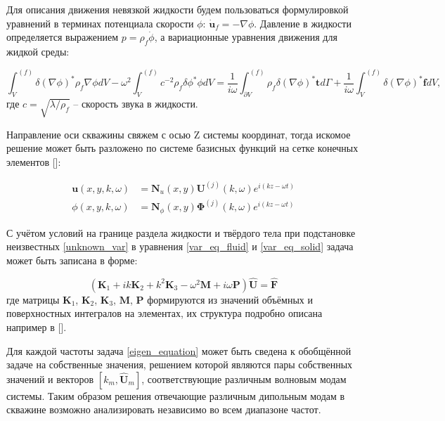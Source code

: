 \documentclass[a4paper,11pt]{article}
\begin{document}
Для описания движения невязкой жидкости будем пользоваться формулировкой уравнений в терминах потенциала скорости $\phi$: $\dot{\mathbf{u}}_f = - \nabla \phi$. Давление в жидкости определяется выражением $p = \rho_f \dot{\phi}$, а вариационные уравнения движения для жидкой среды:

\begin{equation}
\int_{V}^{(f)} \delta (\nabla\phi)^* \rho_f  \nabla \phi dV - \omega^2 \int_{V}^{(f)}  c^{-2} \rho_f \delta \phi^*  \phi dV = \frac{1}{i\omega}\int_{\partial V}^{(f)} \rho_f \delta(\nabla \phi)^* \mathbf{t} d\Gamma + \frac{1}{i\omega} \int_{V}^{(f)} \delta(\nabla \phi)^* \mathbf{f} dV, \label{var_eq_fluid}
\end{equation}
где $c = \sqrt{\lambda/\rho_f}$ -- скорость звука в жидкости.

Направление оси скважины свяжем с осью Z системы координат, тогда искомое решение может быть разложено по системе базисных функций на сетке конечных элементов []:

\begin{equation}
\begin{split}
\mathbf{u}(x,y,k,\omega) & = \mathbf{N}_u(x,y) \mathbf{U}^{(j)}(k,\omega) e^{i(kz-\omega t)} \\
\phi(x,y,k,\omega) & = \mathbf{N}_{\phi}(x,y) \mathbf{\Phi}^{(j)}(k,\omega) e^{i(kz-\omega t)}
\end{split} \label{unknown_var}
\end{equation}

С учётом условий на границе раздела жидкости и твёрдого тела при подстановке неизвестных \eqref{unknown_var} в уравнения \eqref{var_eq_fluid} и \eqref{var_eq_solid} задача может быть записана в форме:

\begin{equation}
(\mathbf{K}_1 + i k \mathbf{K}_2 + k^2 \mathbf{K}_3 - \omega^2 \mathbf{M} + i \omega \mathbf{P}) \hat{\mathbf{U}} = \hat{\mathbf{F}} \label{eigen_equation}
\end{equation}
где матрицы $\mathbf{K}_1$, $\mathbf{K}_2$, $\mathbf{K}_3$, $\mathbf{M}$, $\mathbf{P}$ формируются из значений объёмных и поверхностных интегралов на элементах, их структура подробно описана например в [].

Для каждой частоты задача \eqref{eigen_equation} может быть сведена к обобщённой задаче на собственные значения, решением которой являются пары собственных значений и векторов $[k_m, \hat{\mathbf{U}}_m]$, соответствующие различным волновым модам системы. Таким образом решения отвечающие различным дипольным модам в скважине возможно анализировать независимо во всем диапазоне частот.
\end{document}
